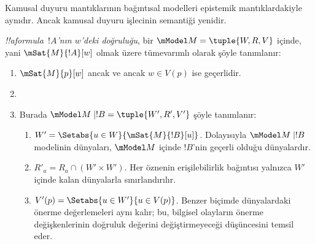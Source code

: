 



Kamusal duyuru mantıklarının bağıntısal modelleri epistemik mantıklardakiyle
aynıdır. Ancak kamusal duyuru işlecinin semantiği yenidir.

\begin{defn} \emph{!!a{formula}~$!A$'nın $w$'deki
  doğruluğu}, bir $\mModel M = \tuple{W, R, V}$ içinde, yani
  $\mSat{M}{!A}[w]$ olmak üzere tümevarımlı olarak şöyle tanımlanır:
  \begin{enumerate}
  \item $\mSat{M}{p}[w]$ ancak ve ancak $w \in V(p)$ ise geçerlidir.
  \item{}
  \item{}

  
  Burada $\mModel M \mid !B = \tuple{W', R', V'}$ şöyle tanımlanır:
  \begin{enumerate}
    \item $W' = \Setabs{ u \in W}{\mSat{M}{!B}[u]}$. Dolayısıyla
      $\mModel M \mid !B$ modelinin dünyaları, $\mModel M$ içinde $!B$'nin
      geçerli olduğu dünyalardır.
    \item $R'_a = R_a \cap (W' \times W')$. Her öznenin erişilebilirlik
      bağıntısı yalnızca $W'$ içinde kalan dünyalarla sınırlandırılır.
    \item $V'(p) = \Setabs{ u \in W'}{u \in V(p) }$. Benzer biçimde
      dünyalardaki önerme değerlemeleri aynı kalır; bu, bilgisel olayların
      önerme değişkenlerinin doğruluk değerini değiştirmeyeceği düşüncesini
      temsil eder.
  \end{enumerate}
  

\end{enumerate}
\end{defn}
